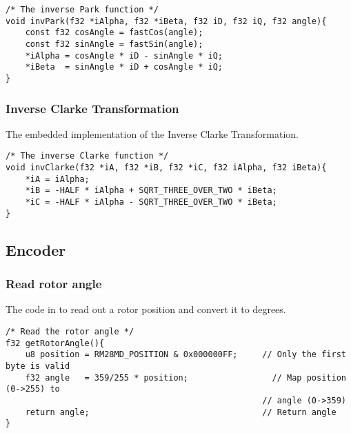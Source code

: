 \begin{lstlisting}[style=c, caption=Embedded Inverse Park Transformation., label=app:code:inverse_park]
/* The inverse Park function */
void invPark(f32 *iAlpha, f32 *iBeta, f32 iD, f32 iQ, f32 angle){
	const f32 cosAngle = fastCos(angle);
	const f32 sinAngle = fastSin(angle);
	*iAlpha = cosAngle * iD - sinAngle * iQ;
	*iBeta  = sinAngle * iD + cosAngle * iQ;
}
\end{lstlisting}



\subsubsection*{Inverse Clarke Transformation}
\label{app:inverse_clarke}
The embedded implementation of the Inverse Clarke Transformation.

\begin{lstlisting}[style=c, caption=Embedded Inverse Clarke Transformation., label=app:code:inverse_clarke]
/* The inverse Clarke function */
void invClarke(f32 *iA, f32 *iB, f32 *iC, f32 iAlpha, f32 iBeta){
	*iA = iAlpha;
	*iB = -HALF * iAlpha + SQRT_THREE_OVER_TWO * iBeta;
	*iC = -HALF * iAlpha - SQRT_THREE_OVER_TWO * iBeta;
}
\end{lstlisting}


\subsection{Encoder}
\subsubsection{Read rotor angle}
The code in to read out a rotor position and convert it to degrees.
\label{app:readRotorAngle}
\begin{lstlisting}[style=c, caption=Function to read an angle from the encoder. The angle is returned in degrees. label=app:code:getRotorAngle]
/* Read the rotor angle */
f32 getRotorAngle(){
    u8 position = RM28MD_POSITION & 0x000000FF;     // Only the first byte is valid
    f32 angle   = 359/255 * position;       	      // Map position (0->255) to 
                                                    // angle (0->359)
    return angle;                                   // Return angle
}
\end{lstlisting}

